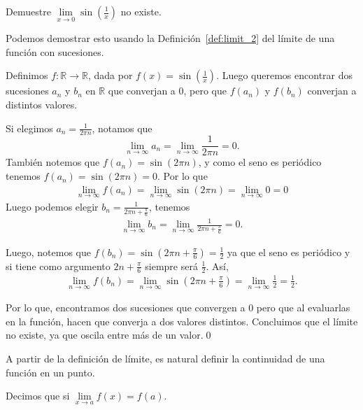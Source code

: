 \documentclass[12pt]{book}
\begin{document}
\begin{exampleenv}
Demuestre $\lim\limits_{x\to 0}\sin(\frac{1}{x})$ no existe.

Podemos demostrar esto usando la Definición~\ref{def:limit_2} del límite de una función con sucesiones. 

Definimos $f:\mathbb{R}\to\mathbb{R}$, dada por $f(x)=\sin(\frac{1}{x})$. Luego queremos encontrar dos sucesiones $a_n$ y $b_n$ en $\mathbb{R}$ que converjan a $0$, pero que $f(a_n)$ y $f(b_n)$ converjan a distintos valores.

Si elegimos $a_n=\frac{1}{2\pi n}$, notamos que 
\[
    \lim\limits_{n\to\infty}a_n=\lim\limits_{n\to\infty}\frac{1}{2\pi n}=0.
\]
También notemos que $f(a_n)=\sin(2\pi n)$, y como el seno es periódico tenemos $f(a_n)=\sin(2\pi n)=0$. Por lo que
\begin{align*}
    \lim\limits_{n\to\infty}f(a_n)=\lim\limits_{n\to\infty}\sin(2\pi n)=\lim\limits_{n\to\infty}0=0
\end{align*}
Luego podemos elegir $b_n=\frac{1}{2\pi n+\frac{\pi}{6}}$, tenemos
\begin{align*}
    \lim\limits_{n\to\infty}b_n=\lim\limits_{n\to\infty}\frac{1}{2\pi n+\frac{\pi}{6}}=0.
\end{align*}

Luego, notemos que $f(b_n)=\sin(2\pi n+\frac{\pi}{6})=\frac{1}{2}$ ya que el seno es periódico y si tiene como argumento $2n+\frac{\pi}{6}$ siempre será $\frac{1}{2}$. Así,
\begin{align*}
    \lim\limits_{n\to\infty}f(b_n)=\lim\limits_{n\to\infty}\sin(2\pi n+\frac{\pi}{6})=\lim\limits_{n\to\infty}\frac{1}{2}=\frac{1}{2}.
\end{align*}

Por lo que, encontramos dos sucesiones que convergen a $0$ pero que al evaluarlas en la función, hacen que converja a dos valores distintos. Concluimos que el límite no existe, ya que oscila entre más de un valor.\qed
\end{exampleenv}

A partir de la definición de límite, es natural definir la continuidad de una función en un punto.

\begin{definitionenv}
    Decimos que  si $\lim\limits_{x\to a}f(x)=f(a)$.
\end{definitionenv}
\end{document}
